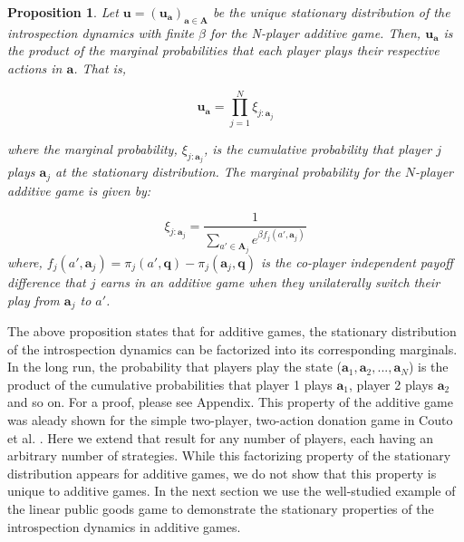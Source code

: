 \documentclass[11pt]{article}
\theoremstyle{plainCl1}
\newtheorem{Prop}{Proposition}
\theoremstyle{plainCl2}
\newcommand{\A}{\mathbf{A}}
\newcommand{\abf}{\mathbf{a}}
\newcommand{\qbf}{\mathbf{q}}
\newcommand{\ubf}{\mathbf{u}}
\begin{document}
\begin{Prop}
Let $\ubf = (\ubf_\abf)_{\abf \in \A}$ be the unique stationary distribution of the introspection dynamics with finite $\beta$ for the N-player additive game. Then, $\ubf_\abf$ is the product of the marginal probabilities that each player plays their respective actions in $\abf$. That is, 

\begin{equation}
\ubf_\abf = \prod_{j = 1}^N \xi_{j:\abf_j}
\label{Eq:additive-game-products}
\end{equation}

\noindent where the marginal probability, $\xi_{j:\abf_j}$, is the cumulative probability that player $j$ plays $\abf_j$ at the stationary distribution. The marginal probability for the $N$-player additive game is given by: 

\begin{equation}
\xi_{j:\abf_j} = \frac{1}{\displaystyle \sum_{a' \in \A_j} e^{\beta f_j(a', \abf_j)}} 
\label{Eq:marginal-at-additive-game}
\end{equation}
\noindent where, $f_j(a', \abf_j) = \pi_j(a', \qbf) - \pi_j(\abf_j, \qbf)$ is the co-player independent payoff difference that $j$  earns in an additive game when they unilaterally switch their play from $\abf_j$ to $a'$.
\label{Th:additive-game-product-of-marginals}
\end{Prop}
\noindent The above proposition states that for additive games, the stationary distribution of the introspection dynamics can be factorized into its corresponding marginals. In the long run, the probability that players play the state ($\abf_1, \abf_2, ...,\abf_N$) is the product of the cumulative probabilities that player 1 plays $\abf_1$, player 2 plays $\abf_2$ and so on. For a proof, please see Appendix. This property of the additive game was aleady shown for the simple two-player, two-action donation game in Couto et al. \cite{Couto:NJP:2022}.  Here we extend that result for any number of players, each having an arbitrary number of strategies. While this factorizing property of the stationary distribution appears for additive games, we do not show that this property is unique to additive games. In the next section we use the well-studied example of the linear public goods game to demonstrate the stationary properties of the introspection dynamics in additive games. 
\end{document}
